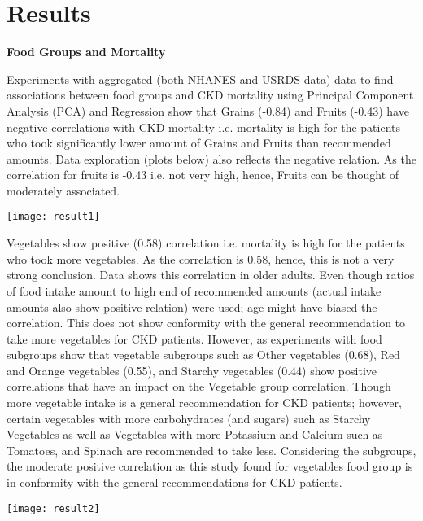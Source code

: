 
\section{Results}
\noindent \textbf{Food Groups and Mortality}

\noindent Experiments with aggregated (both NHANES and USRDS data) data to find associations between food groups and CKD mortality using Principal Component Analysis (PCA) and Regression show that Grains (-0.84) and Fruits (-0.43) have negative correlations with CKD mortality i.e. mortality is high for the patients who took significantly lower amount of Grains and Fruits than recommended amounts. Data exploration (plots below) also reflects the negative relation. As the correlation for fruits is -0.43 i.e. not very high, hence, Fruits can be thought of moderately associated.

\medskip 
\texttt{[image: result1]}
\medskip 

\noindent Vegetables show positive (0.58) correlation i.e. mortality is high for the patients who took more vegetables. As the correlation is 0.58, hence, this is not a very strong conclusion. Data shows this correlation in older adults. Even though ratios of food intake amount to high end of recommended amounts (actual intake amounts also show positive relation) were used; age might have biased the correlation. This does not show conformity with the general recommendation to take more vegetables for CKD patients. However, as experiments with food subgroups show that vegetable subgroups such as Other vegetables (0.68), Red and Orange vegetables (0.55), and Starchy vegetables (0.44) show positive correlations that have an impact on the Vegetable group correlation.  Though more vegetable intake is a general recommendation for CKD patients; however, certain vegetables with more carbohydrates (and sugars) such as Starchy Vegetables as well as Vegetables with more Potassium and Calcium such as Tomatoes, and Spinach are recommended to take less. Considering the subgroups, the moderate positive correlation as this study found for vegetables food group is in conformity with the general recommendations for CKD patients.

\medskip 
\texttt{[image: result2]}
\medskip 


